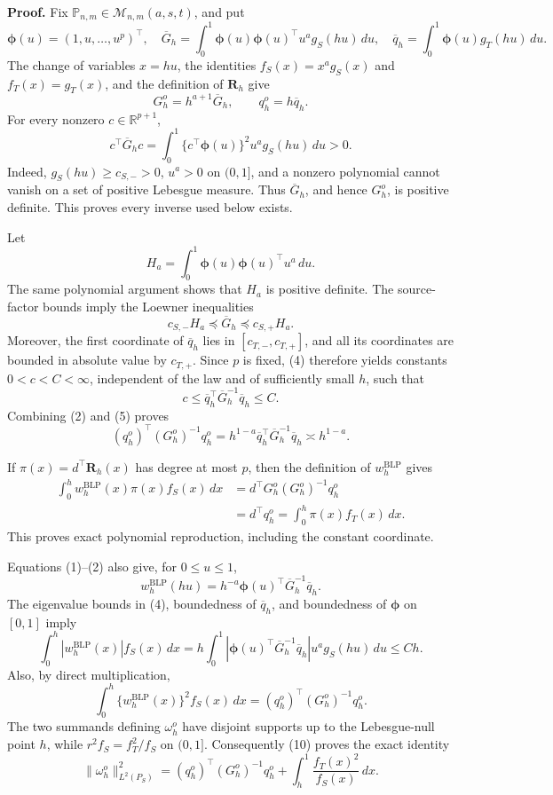 \textbf{Proof.}
Fix \(\mathbb P_{n,m}\in\mathcal M_{n,m}(a,s,t)\), and put
\[
\boldsymbol\phi(u)=(1,u,\ldots,u^p)^\top,
\quad
\overline G_h=\int_0^1\boldsymbol\phi(u)\boldsymbol\phi(u)^\top u^a g_S(hu)\,du,
\quad
\overline q_h=\int_0^1\boldsymbol\phi(u)g_T(hu)\,du.
\tag{1}
\]
The change of variables \(x=hu\), the identities \(f_S(x)=x^ag_S(x)\) and \(f_T(x)=g_T(x)\), and the definition of \(\mathbf R_h\) give
\[
G_h^o=h^{a+1}\overline G_h,
\qquad
q_h^o=h\overline q_h.
\tag{2}
\]
For every nonzero \(c\in\mathbb R^{p+1}\),
\[
c^\top\overline G_hc
=\int_0^1\{c^\top\boldsymbol\phi(u)\}^2u^ag_S(hu)\,du>0.
\tag{3}
\]
Indeed, \(g_S(hu)\ge c_{S,-}>0\), \(u^a>0\) on \((0,1]\), and a nonzero polynomial cannot vanish on a set of positive Lebesgue measure. Thus \(\overline G_h\), and hence \(G_h^o\), is positive definite. This proves every inverse used below exists.

Let
\[
H_a=\int_0^1\boldsymbol\phi(u)\boldsymbol\phi(u)^\top u^a\,du.
\]
The same polynomial argument shows that \(H_a\) is positive definite. The source-factor bounds imply the Loewner inequalities
\[
c_{S,-}H_a\preceq\overline G_h\preceq c_{S,+}H_a.
\tag{4}
\]
Moreover, the first coordinate of \(\overline q_h\) lies in \([c_{T,-},c_{T,+}]\), and all its coordinates are bounded in absolute value by \(c_{T,+}\). Since \(p\) is fixed, (4) therefore yields constants \(0<c<C<\infty\), independent of the law and of sufficiently small \(h\), such that
\[
c\le \overline q_h^\top\overline G_h^{-1}\overline q_h\le C.
\tag{5}
\]
Combining (2) and (5) proves
\[
(q_h^o)^\top(G_h^o)^{-1}q_h^o
=h^{1-a}\overline q_h^\top\overline G_h^{-1}\overline q_h
\asymp h^{1-a}.
\tag{6}
\]

If \(\pi(x)=d^\top\mathbf R_h(x)\) has degree at most \(p\), then the definition of \(w_h^{\mathrm{BLP}}\) gives
\[
\begin{aligned}
\int_0^h w_h^{\mathrm{BLP}}(x)\pi(x)f_S(x)\,dx
&=d^\top G_h^o(G_h^o)^{-1}q_h^o\\
&=d^\top q_h^o
=\int_0^h\pi(x)f_T(x)\,dx.
\end{aligned}
\tag{7}
\]
This proves exact polynomial reproduction, including the constant coordinate.

Equations (1)--(2) also give, for \(0\le u\le1\),
\[
w_h^{\mathrm{BLP}}(hu)
=h^{-a}\boldsymbol\phi(u)^\top\overline G_h^{-1}\overline q_h.
\tag{8}
\]
The eigenvalue bounds in (4), boundedness of \(\overline q_h\), and boundedness of \(\boldsymbol\phi\) on \([0,1]\) imply
\[
\int_0^h|w_h^{\mathrm{BLP}}(x)|f_S(x)\,dx
=h\int_0^1
\left|\boldsymbol\phi(u)^\top\overline G_h^{-1}\overline q_h\right|
u^ag_S(hu)\,du
\le Ch.
\tag{9}
\]
Also, by direct multiplication,
\[
\int_0^h\{w_h^{\mathrm{BLP}}(x)\}^2f_S(x)\,dx
=(q_h^o)^\top(G_h^o)^{-1}q_h^o.
\tag{10}
\]
The two summands defining \(\omega_h^o\) have disjoint supports up to the Lebesgue-null point \(h\), while \(r^2f_S=f_T^2/f_S\) on \((0,1]\). Consequently (10) proves the exact identity
\[
\|\omega_h^o\|_{L^2(P_S)}^2
=(q_h^o)^\top(G_h^o)^{-1}q_h^o
+\int_h^1\frac{f_T(x)^2}{f_S(x)}\,dx.
\tag{11}
\]

